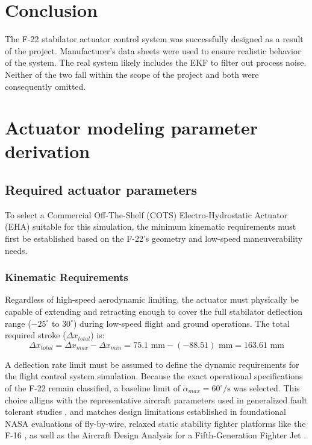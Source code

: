 \documentclass[
bindingoffset=5mm,  %
footnoteindent=3mm, %
hyphenation=true    %
]{src/wut-thesis}
\begin{document}
	\section{Conclusion}
	
	The F-22 stabilator actuator control system was successfully designed as a result of the project. Manufacturer's data sheets were used to ensure realistic behavior of the system. The real system likely includes the EKF to filter out process noise. Neither of the two fall within the scope of the project and both were consequently omitted.
	
	\newpage
	
	\setcounter{section}{0}
	\renewcommand{\thesection}{\Alph{section}}
	
	\section{Actuator modeling parameter derivation}
	
	\subsection{Required actuator parameters}
	
	To select a Commercial Off-The-Shelf (COTS) Electro-Hydrostatic Actuator (EHA) suitable for this simulation, the minimum kinematic requirements must first be established based on the F-22's geometry and low-speed maneuverability needs.
	
	\subsubsection{Kinematic Requirements}
	Regardless of high-speed aerodynamic limiting, the actuator must physically be capable of extending and retracting enough to cover the full stabilator deflection range ($-25^\circ$ to $30^\circ$) during low-speed flight and ground operations. The total required stroke ($\Delta x_{total}$) is:
	\begin{equation}
		\Delta x_{total} = \Delta x_{max} - \Delta x_{min} = 75.1 \text{ mm} - (-88.51) \text{ mm} = 163.61 \text{ mm}
	\end{equation}
	
   A deflection rate limit must be assumed to define the dynamic requirements for the flight control system simulation. Because the exact operational specifications of the F-22 remain classified, a baseline limit of $\dot{\alpha}_{max} = 60^{\circ}/\text{s}$ was selected. This choice alligns with the representative aircraft parameters used in generalized fault tolerant studies \cite{Hess1999Accommodating}, and matches design limitations established in foundational NASA evaluations of fly-by-wire, relaxed static stability fighter platforms like the F-16 \cite{Nguyen1979Simulator}, as well as the Aircraft Design Analysis for a Fifth-Generation Fighter Jet \cite{DeflectionLimits}.
   
\end{document}
